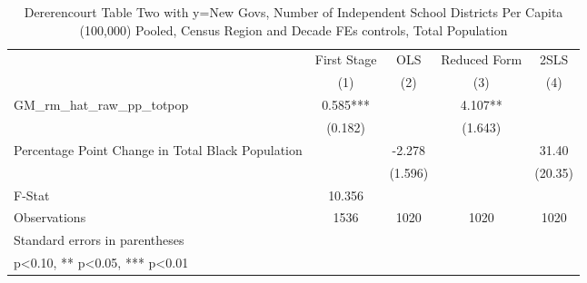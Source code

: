 \begin{table}[htbp]\centering
\def\sym#1{\ifmmode^{#1}\else\(^{#1}\)\fi}
\caption{Dererencourt Table Two with y=New Govs, Number of Independent School Districts Per Capita (100,000) Pooled, Census Region and Decade FEs controls, Total Population}
\begin{tabular}{l*{4}{c}}
\toprule
                    & First Stage   &         OLS   &Reduced Form   &        2SLS   \\
                    &\multicolumn{1}{c}{(1)}   &\multicolumn{1}{c}{(2)}   &\multicolumn{1}{c}{(3)}   &\multicolumn{1}{c}{(4)}   \\
\midrule
GM\_rm\_hat\_raw\_pp\_totpop&       0.585***&               &       4.107** &               \\
                    &     (0.182)   &               &     (1.643)   &               \\
\addlinespace
Percentage Point Change in Total Black Population&               &      -2.278   &               &       31.40   \\
                    &               &     (1.596)   &               &     (20.35)   \\
\midrule
F-Stat              &      10.356   &               &               &               \\
Observations        &        1536   &        1020   &        1020   &        1020   \\
\bottomrule
\multicolumn{5}{l}{\footnotesize Standard errors in parentheses}\\
\multicolumn{5}{l}{\footnotesize * p<0.10, ** p<0.05, *** p<0.01}\\
\end{tabular}
\end{table}
